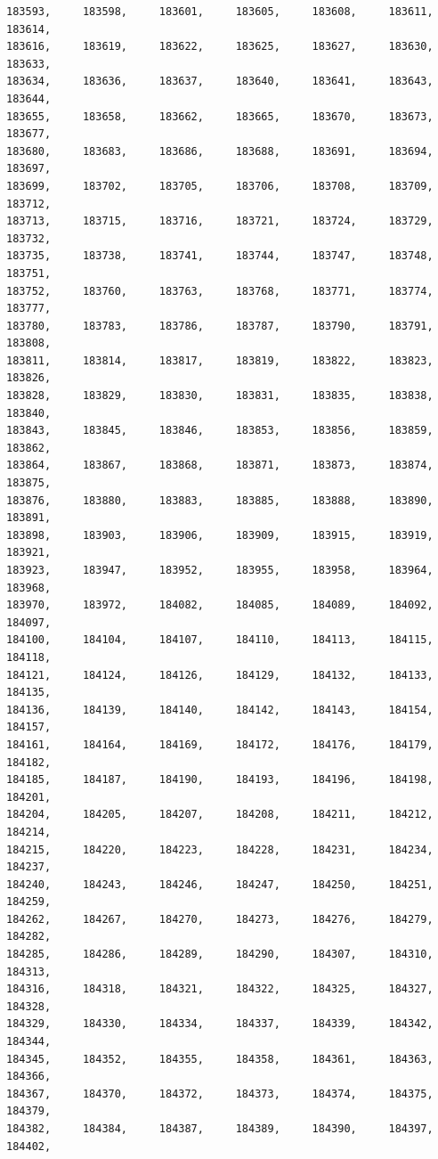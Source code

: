 \documentclass[a4paper,11pt]{report}
\begin{document}
\begin{verbatim}
183593,     183598,     183601,     183605,     183608,     183611,     183614,
183616,     183619,     183622,     183625,     183627,     183630,     183633,
183634,     183636,     183637,     183640,     183641,     183643,     183644,
183655,     183658,     183662,     183665,     183670,     183673,     183677,
183680,     183683,     183686,     183688,     183691,     183694,     183697,
183699,     183702,     183705,     183706,     183708,     183709,     183712,
183713,     183715,     183716,     183721,     183724,     183729,     183732,
183735,     183738,     183741,     183744,     183747,     183748,     183751,
183752,     183760,     183763,     183768,     183771,     183774,     183777,
183780,     183783,     183786,     183787,     183790,     183791,     183808,
183811,     183814,     183817,     183819,     183822,     183823,     183826,
183828,     183829,     183830,     183831,     183835,     183838,     183840,
183843,     183845,     183846,     183853,     183856,     183859,     183862,
183864,     183867,     183868,     183871,     183873,     183874,     183875,
183876,     183880,     183883,     183885,     183888,     183890,     183891,
183898,     183903,     183906,     183909,     183915,     183919,     183921,
183923,     183947,     183952,     183955,     183958,     183964,     183968,
183970,     183972,     184082,     184085,     184089,     184092,     184097,
184100,     184104,     184107,     184110,     184113,     184115,     184118,
184121,     184124,     184126,     184129,     184132,     184133,     184135,
184136,     184139,     184140,     184142,     184143,     184154,     184157,
184161,     184164,     184169,     184172,     184176,     184179,     184182,
184185,     184187,     184190,     184193,     184196,     184198,     184201,
184204,     184205,     184207,     184208,     184211,     184212,     184214,
184215,     184220,     184223,     184228,     184231,     184234,     184237,
184240,     184243,     184246,     184247,     184250,     184251,     184259,
184262,     184267,     184270,     184273,     184276,     184279,     184282,
184285,     184286,     184289,     184290,     184307,     184310,     184313,
184316,     184318,     184321,     184322,     184325,     184327,     184328,
184329,     184330,     184334,     184337,     184339,     184342,     184344,
184345,     184352,     184355,     184358,     184361,     184363,     184366,
184367,     184370,     184372,     184373,     184374,     184375,     184379,
184382,     184384,     184387,     184389,     184390,     184397,     184402,

\end{verbatim}
\end{document}
